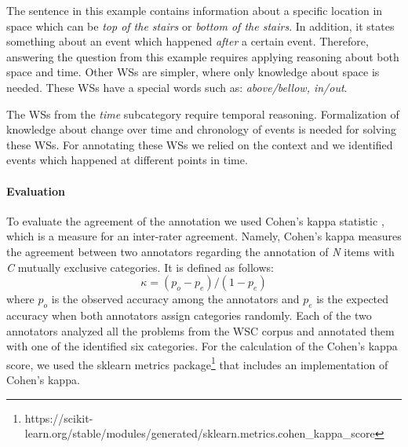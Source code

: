 The sentence in this example contains information about a specific location in space which can be \textit{top of the stairs} or \textit{bottom of the stairs}. In addition, it states something about an event which happened \textit{after} a certain event. Therefore, answering the question from this example requires applying reasoning about both space and time. Other WSs are simpler, where only knowledge about space is needed. These WSs have a special words such as: \textit{above/bellow, in/out}.

The WSs from the \textit{time} subcategory require temporal reasoning. 
Formalization of knowledge about change over time and chronology of events is needed for solving these WSs. For annotating these WSs we relied on the context and we identified events which happened at different points in time.

\begin{comment}

\textit{Example 3.2}
\begin{itemize} \label{Ex2}
	\item[\textbf{S:}] \textbf{The man could not lift his son because he was so [weak/heavy].}
	\item[\textbf{Q:}] \textbf{Who was [weak/heavy]?}
	\item[\textbf{A:}] \textbf{The man/the son.}
\end{itemize}

While heavy is a description of the weight of an object/a person, weak on the other hand is a description of the strength. Both special words represent a physical trait of the ambiguous pronoun, but they are not from the same subcategory.
\end{comment}


\paragraph{Evaluation}
To evaluate the agreement of the annotation 
we used Cohen's kappa statistic \cite{doi:10.1177/001316446002000104}, which is a measure for an inter-rater agreement. Namely, Cohen's kappa measures the agreement between two annotators regarding the annotation of \textit{N} items with \textit{C} mutually exclusive categories. 
It is defined as follows: 
\begin{equation}
	\kappa = (p_o-p_e)/(1-p_e)
\end{equation}
where $p_o$ is the observed accuracy among the annotators and $p_e$ is the expected accuracy when both annotators assign categories randomly. Each of the two annotators analyzed all the problems from the WSC corpus and annotated them with one of the identified six categories. For the calculation of the Cohen's kappa score, we used the sklearn metrics  package\footnote{https://scikit-learn.org/stable/modules/generated/sklearn.metrics.cohen\_kappa\_score} that includes an implementation of Cohen's kappa.

